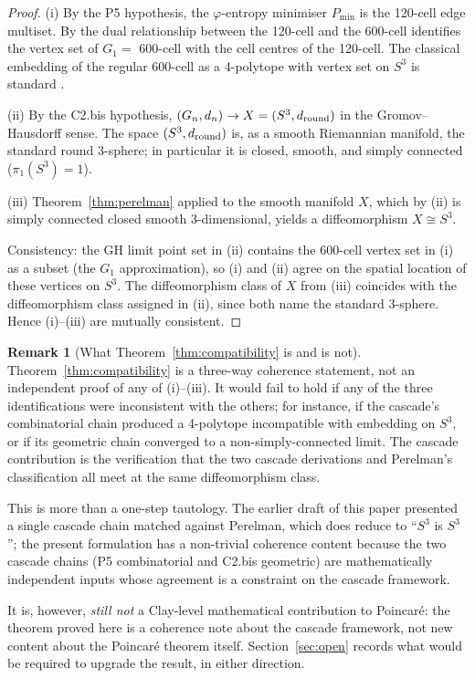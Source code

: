 \documentclass[11pt, a4paper]{amsart}
\theoremstyle{definition}
\newtheorem{remark}[theorem]{Remark}
\begin{document}
\begin{proof}
(i) By the P5 hypothesis, the $\varphi$-entropy minimiser $P_{\min}$
is the 120-cell edge multiset. By
\cite[\S P5.3]{CascadePregeometry} the dual relationship
between the 120-cell and the 600-cell identifies the vertex set of
$G_{1} = $ 600-cell with the cell centres of the 120-cell. The
classical embedding of the regular 600-cell as a 4-polytope with
vertex set on $S^{3}$ is standard \cite[\S 8.7]{CoxeterRegularPolytopes}.

(ii) By the C2.bis hypothesis, $(G_{n}, d_{n}) \to X = (S^{3},
d_{\rm round})$ in the Gromov--Hausdorff sense. The space $(S^{3},
d_{\rm round})$ is, as a smooth Riemannian manifold, the standard
round $3$-sphere; in particular it is closed, smooth, and simply
connected ($\pi_{1}(S^{3}) = 1$).

(iii) Theorem~\ref{thm:perelman} applied to the smooth manifold
$X$, which by (ii) is simply connected closed smooth $3$-dimensional,
yields a diffeomorphism $X \cong S^{3}$.

Consistency: the GH limit point set in (ii) contains the 600-cell
vertex set in (i) as a subset (the $G_{1}$ approximation), so (i)
and (ii) agree on the spatial location of these vertices on $S^{3}$.
The diffeomorphism class of $X$ from (iii) coincides with the
diffeomorphism class assigned in (ii), since both name the standard
$3$-sphere. Hence (i)--(iii) are mutually consistent.
\end{proof}

\begin{remark}[What Theorem~\ref{thm:compatibility} is and is not]
\label{rmk:scope}
Theorem~\ref{thm:compatibility} is a three-way coherence
statement, not an independent proof of any of (i)--(iii). It
would fail to hold if any of the three identifications were
inconsistent with the others; for instance, if the cascade's
combinatorial chain produced a 4-polytope incompatible with
embedding on $S^{3}$, or if its geometric chain converged to a
non-simply-connected limit. The cascade contribution is the
verification that the two cascade derivations and Perelman's
classification all meet at the same diffeomorphism class.

This is more than a one-step tautology. The earlier draft of this
paper presented a single cascade chain matched against Perelman,
which does reduce to ``$S^{3}$ is $S^{3}$''; the present
formulation has a non-trivial coherence content because the two
cascade chains (P5 combinatorial and C2.bis geometric) are
mathematically independent inputs whose agreement is a constraint
on the cascade framework.

It is, however, \emph{still not} a Clay-level mathematical
contribution to Poincar\'{e}: the theorem proved here is a
coherence note about the cascade framework, not new content
about the Poincar\'{e} theorem itself. Section~\ref{sec:open}
records what would be required to upgrade the result, in either
direction.
\end{remark}
\end{document}

